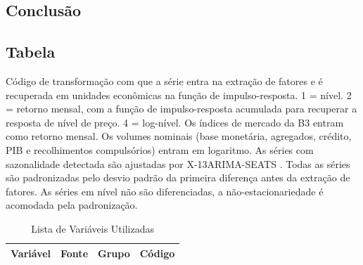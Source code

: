 \documentclass[
article,			%
12pt,				%
oneside,			%
a4paper,			%
hidelinks, 
english,			%
brazil,				%
]{abntex2}
\theoremstyle{plain}
\theoremstyle{definition}
\theoremstyle{remark}
\begin{document}

\section{Conclusão}



\newpage





\begin{anexosenv}


\partanexos
\chapter{Tabela}\label{anexo-A}

\begin{ThreePartTable}
\begin{TableNotes}
\footnotesize
\item[*] Código de transformação com que a série entra na extração de fatores e é recuperada em unidades econômicas na função de impulso-resposta. 1 = nível. 2 = retorno mensal, com a função de impulso-resposta acumulada para recuperar a resposta de nível de preço. 4 = log-nível. Os índices de mercado da B3 entram como retorno mensal. Os volumes nominais (base monetária, agregados, crédito, PIB e recolhimentos compulsórios) entram em logaritmo. As séries com sazonalidade detectada são ajustadas por X-13ARIMA-SEATS \cite{sax2018seasonal}. Todas as séries são padronizadas pelo desvio padrão da primeira diferença \cite{barigozzi2016non} antes da extração de fatores. As séries em nível não são diferenciadas, a não-estacionariedade é acomodada pela padronização.
\end{TableNotes}

\footnotesize
\setlength{\tabcolsep}{4pt}
\begin{longtable}{@{}p{5.2cm} l l c@{}}
\caption{Lista de Variáveis Utilizadas}\label{tab:lista_variaveis} \\
\toprule
\textbf{Variável} & \textbf{Fonte} & \textbf{Grupo} & \textbf{Código} \\
\midrule
\endfirsthead


\end{longtable}
\end{ThreePartTable}
\end{anexosenv}
\end{document}
